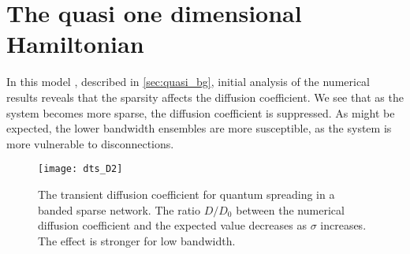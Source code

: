 

\section{The quasi one dimensional Hamiltonian}


In this model , described in \autoref{sec:quasi_bg}, initial analysis of
the numerical results reveals that the sparsity affects the diffusion coefficient.
We see that as the system becomes more sparse, the diffusion coefficient is suppressed. 
As might be expected, the lower bandwidth ensembles are more
susceptible, as the system is more vulnerable to disconnections.



\begin{figure}
\texttt{[image: dts\_D2]}
\caption{The transient diffusion coefficient for quantum spreading in
a banded sparse network. The ratio $D/D_0$ between the numerical diffusion 
coefficient and the expected value decreases as $\sigma$ increases. The effect
is stronger for low bandwidth.}
\end{figure}
